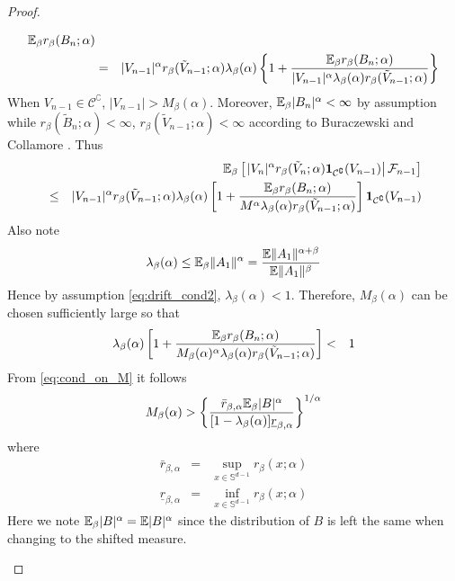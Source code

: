 \documentclass{article}
\theoremstyle{remark}
\begin{document}
\begin{proof}
\begin{enumerate}
\begin{eqnarray*}
      \mathbb{E}_\beta r_\beta(B_n; \alpha) \\
      &=& |V_{n-1}|^\alpha r_\beta(\tilde V_{n-1}; \alpha) \lambda_\beta(\alpha)
      \left\{
        1 + 
        {\mathbb{E}_\beta r_\beta(B_n; \alpha) \over |V_{n-1}|^\alpha \lambda_\beta(\alpha) r_\beta(\tilde V_{n-1}; \alpha)}
         \right\} \\
    \end{eqnarray*}
    When $V_{n-1} \in \mathcal C^\complement$, $|V_{n-1}| > M_\beta(\alpha)$.
    Moreover, $\mathbb{E}_\beta|B_n|^\alpha < \infty$ by assumption while
    $r_\beta(\tilde B_n; \alpha) < \infty$, $r_\beta(\tilde V_{n-1}; \alpha) < \infty$
    according to Buraczewski and Collamore \cite{BCDZ2014}. Thus
    \begin{eqnarray*}
      && \mathbb{E}_\beta \left[ \left.
          |V_n|^\alpha r_\beta(\tilde V_n; \alpha) \mathbf{1}_{\mathcal C^\complement}(V_{n-1})
        \right| \mathcal F_{n-1}
      \right] \\
      &\leq&
      |V_{n-1}|^\alpha r_\beta(\tilde V_{n-1}; \alpha) \lambda_\beta(\alpha)
      \left[
        1 + 
        {\mathbb{E}_\beta r_\beta(B_n; \alpha) \over M^\alpha \lambda_\beta(\alpha) r_\beta(\tilde V_{n-1}; \alpha)}
      \right]
      \mathbf{1}_{\mathcal C^\complement}(V_{n-1})
    \end{eqnarray*}
    Also note
    \begin{equation*}
      \lambda_\beta(\alpha) \leq \mathbb{E}_\beta \|A_1\|^\alpha = {
        \mathbb{E} \|A_1\|^{\alpha + \beta}
        \over
        \mathbb{E} \|A_1\|^{\beta}
      }
    \end{equation*}
    Hence by assumption \eqref{eq:drift_cond2}, $\lambda_\beta(\alpha)
    < 1$. Therefore, $M_\beta(\alpha)$ can be chosen sufficiently large so that
    \begin{eqnarray}
      \lambda_\beta(\alpha) \left[
        1 +  
        {\mathbb{E}_\beta r_\beta(B_n; \alpha) \over M_\beta(\alpha)^\alpha
          \lambda_\beta(\alpha) r_\beta(\tilde V_{n-1}; \alpha)}
        \right] &<& 1 \label{eq:cond_on_M}
    \end{eqnarray}
    From \eqref{eq:cond_on_M} it follows
    \begin{equation}
      \label{eq:C_set}
      M_\beta(\alpha) > \left\{
        \bar r_{\beta, \alpha}\mathbb{E}_\beta |B|^\alpha
          \over
          [1 - \lambda_\beta(\alpha)] \underline r_{\beta, \alpha}
        \right\}^{1/\alpha}
    \end{equation}
    where
    \begin{eqnarray*}
      \bar r_{\beta, \alpha} &=& \sup_{x \in \mathbb S^{d-1}}
      r_\beta(x; \alpha) \\
      \underline r_{\beta, \alpha} &=& \inf_{x \in \mathbb S^{d-1}}
      r_\beta(x; \alpha)
    \end{eqnarray*}
    Here we note $\mathbb{E}_\beta |B|^\alpha = \mathbb{E} |B|^\alpha$
    since the distribution of $B$ is left the same when
    changing to the shifted measure.


\end{enumerate}
\end{proof}
\end{document}
